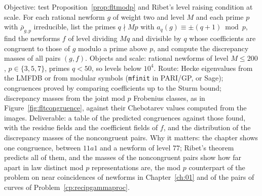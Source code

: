 \begin{compproblem}\label{cp:fltlevel}
Objective: test Proposition~\ref{prop:fltmodp} and Ribet's level raising condition \cite{ribet1984} at scale. For each rational newform $g$ of weight two and level $M$ and each prime $p$ with $\bar\rho_{g,p}$ irreducible, list the primes $q\nmid Mp$ with $a_q(g)\equiv\pm(q+1)\bmod p$, find the newforms $f$ of level dividing $Mq$ and divisible by $q$ whose coefficients are congruent to those of $g$ modulo a prime above $p$, and compute the discrepancy masses of all pairs $(g,f)$. Objects and scale: rational newforms of level $M\le200$, $p\in\{3,5,7\}$, primes $q<50$, so levels below $10^4$. Route: Hecke eigenvalues from the LMFDB \cite{lmfdb} or from modular symbols (\texttt{mfinit} in PARI/GP, or Sage); congruences proved by comparing coefficients up to the Sturm bound; discrepancy masses from the joint mod $p$ Frobenius classes, as in Figure~\ref{fig:fltcongruence}, against their Chebotarev values computed from the images. Deliverable: a table of the predicted congruences against those found, with the residue fields and the coefficient fields of $f$, and the distribution of the discrepancy masses of the noncongruent pairs. Why it matters: the chapter shows one congruence, between $11a1$ and a newform of level $77$; Ribet's theorem \cite{ribet1984,ribet1990b} predicts all of them, and the masses of the noncongruent pairs show how far apart in law distinct mod $p$ representations are, the mod $p$ counterpart of the problem on near coincidences of newforms in Chapter~\ref{ch:01} and of the pairs of curves of Problem~\ref{cp:recipgammaproc}.
\end{compproblem}
